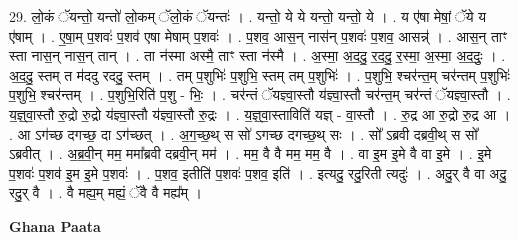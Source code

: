 \documentclass[17pt]{extarticle}
\begin{document}
29. लो॒कं ॅयन्तो॒ यन्तो॑ लो॒कम् ॅलो॒कं ॅयन्तः॑ । . यन्तो॒ ये ये यन्तो॒ यन्तो॒ ये । . य ए॑षा मेषां॒ ॅये य ए॑षाम् । . ए॒षा॒म् प॒शवः॑ प॒शव॑ एषा मेषाम् प॒शवः॑ । . प॒शव॒ आस॒न् नास॑न् प॒शवः॑ प॒शव॒ आसन्न्॑ । . आस॒न् ताꣳ स्ता नास॒न् नास॒न् तान् । . ता न॑स्मा अस्मै॒ ताꣳ स्ता न॑स्मै । . अ॒स्मा॒ अ॒द॒दु॒ र॒द॒दु॒ र॒स्मा॒ अ॒स्मा॒ अ॒द॒दुः॒ । . अ॒द॒दु॒ स्तम् त म॑ददु रददु॒ स्तम् । . तम् प॒शुभिः॑ प॒शुभि॒ स्तम् तम् प॒शुभिः॑ । . प॒शुभि॒ श्चर॑न्त॒म् चर॑न्तम् प॒शुभिः॑ प॒शुभि॒ श्चर॑न्तम् । . प॒शुभि॒रिति॑ प॒शु - भिः॒ । . चर॑न्तं ॅयज्ञ्वा॒स्तौ य॑ज्ञ्वा॒स्तौ चर॑न्त॒म् चर॑न्तं ॅयज्ञ्वा॒स्तौ । . य॒ज्ञ्॒वा॒स्तौ रु॒द्रो रु॒द्रो य॑ज्ञ्वा॒स्तौ य॑ज्ञ्वा॒स्तौ रु॒द्रः । . य॒ज्ञ्॒वा॒स्ताविति॑ यज्ञ् - वा॒स्तौ । . रु॒द्र आ रु॒द्रो रु॒द्र आ । . आ ऽग॑च्छ दगच्छ॒ दा ऽग॑च्छत् । . अ॒ग॒च्छ॒थ् स सो॑ ऽगच्छ दगच्छ॒थ् सः । . सो᳚ ऽब्रवी दब्रवी॒थ् स सो᳚ ऽब्रवीत् । . अ॒ब्र॒वी॒न् मम॒ ममा᳚ब्रवी दब्रवी॒न् मम॑ । . मम॒ वै वै मम॒ मम॒ वै । . वा इ॒म इ॒मे वै वा इ॒मे । . इ॒मे प॒शवः॑ प॒शव॑ इ॒म इ॒मे प॒शवः॑ । . प॒शव॒ इतीति॑ प॒शवः॑ प॒शव॒ इति॑ । . इत्यदु॒ रदु॒रिती त्यदुः॑ । . अदु॒र् वै वा अदु॒ रदु॒र् वै । . वै मह्य॒म् मह्यं॒ ॅवै वै मह्य᳚म् । \newline

\textbf{Ghana Paata } \newline
\end{document}
